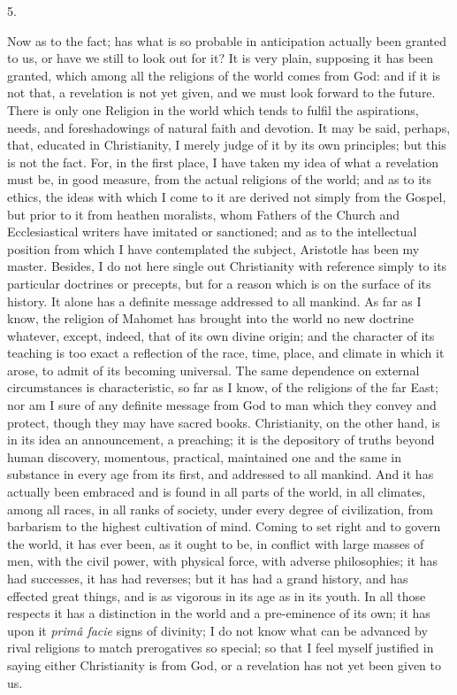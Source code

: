 5.

Now as to the fact; has what is so probable in anticipation
actually been granted to us, or have we still to look out for it? It
is very plain, supposing it has been granted, which among all the
religions of the world comes from God: and if it is not that, a
revelation is not yet given, and we must look forward to the
future. There is only one Religion in the world which tends to fulfil
the aspirations, needs, and foreshadowings of natural faith and
devotion. It may be said, perhaps, that, educated in Christianity, I
merely judge of it by its own principles; but this is not the fact.
For, in the first place, I have taken my idea of what a revelation
must be, in good measure, from the actual religions of the world; and
as to its ethics, the ideas with which I come to it are derived not
simply from the Gospel, but prior to it from heathen moralists, whom
Fathers of the Church and Ecclesiastical writers have imitated or
sanctioned; and as to the intellectual position from which I have
contemplated the subject, Aristotle has been my master. Besides, I do
not here single out Christianity with reference simply to its
particular doctrines or precepts, but for a reason which is on the
surface of its history. It alone has a definite message addressed to
all mankind. As far as I know, the religion of Mahomet has brought
into the world no new doctrine whatever, except, indeed, that of its
own divine origin; and the character of its teaching is too exact a
reflection of the race, time, place, and climate in which it arose, to
admit of its becoming universal. The same dependence on external
circumstances is characteristic, so far as I know, of the religions of
the far East; nor am I sure of any definite message from God to man
which they convey and protect, though they may have sacred books.
Christianity, on the other hand, is in its idea an announcement, a
preaching; it is the depository of truths beyond human discovery,
momentous, practical, maintained one and the same in substance
in every age from its first, and addressed to all mankind. And it has
actually been embraced and is found in all parts of the world, in all
climates, among all races, in all ranks of society, under every degree
of civilization, from barbarism to the highest cultivation of mind.
Coming to set right and to govern the world, it has ever been, as it
ought to be, in conflict with large masses of men, with the civil
power, with physical force, with adverse philosophies; it has had
successes, it has had reverses; but it has had a grand history, and
has effected great things, and is as vigorous in its age as in its
youth. In all those respects it has a distinction in the world and a
pre-eminence of its own; it has upon it \emph{primâ facie} signs of
divinity; I do not know what can be advanced by rival religions to
match prerogatives so special; so that I feel myself justified in
saying either Christianity is from God, or a revelation has not yet
been given to us.

